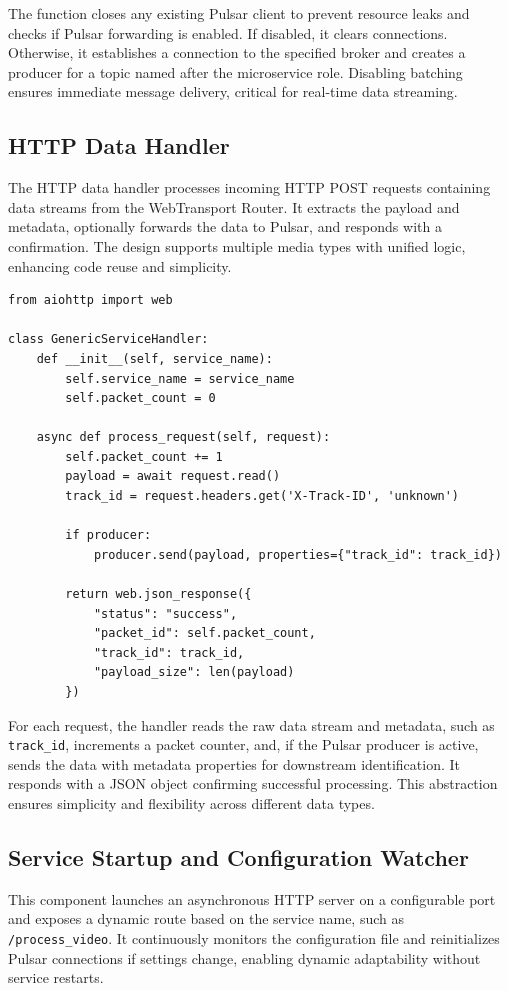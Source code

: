The function closes any existing Pulsar client to prevent resource leaks and checks if Pulsar forwarding is enabled. If disabled, it clears connections. Otherwise, it establishes a connection to the specified broker and creates a producer for a topic named after the microservice role. Disabling batching ensures immediate message delivery, critical for real-time data streaming.

\subsection{HTTP Data Handler}
The HTTP data handler processes incoming HTTP POST requests containing data streams from the WebTransport Router. It extracts the payload and metadata, optionally forwards the data to Pulsar, and responds with a confirmation. The design supports multiple media types with unified logic, enhancing code reuse and simplicity.

\begin{lstlisting}[breaklines=true,basicstyle=\small\ttfamily,frame=single]
from aiohttp import web

class GenericServiceHandler:
    def __init__(self, service_name):
        self.service_name = service_name
        self.packet_count = 0

    async def process_request(self, request):
        self.packet_count += 1
        payload = await request.read()
        track_id = request.headers.get('X-Track-ID', 'unknown')

        if producer:
            producer.send(payload, properties={"track_id": track_id})

        return web.json_response({
            "status": "success",
            "packet_id": self.packet_count,
            "track_id": track_id,
            "payload_size": len(payload)
        })
\end{lstlisting}

For each request, the handler reads the raw data stream and metadata, such as \texttt{track\_id}, increments a packet counter, and, if the Pulsar producer is active, sends the data with metadata properties for downstream identification. It responds with a JSON object confirming successful processing. This abstraction ensures simplicity and flexibility across different data types.

\subsection{Service Startup and Configuration Watcher}
This component launches an asynchronous HTTP server on a configurable port and exposes a dynamic route based on the service name, such as \texttt{/process\_video}. It continuously monitors the configuration file and reinitializes Pulsar connections if settings change, enabling dynamic adaptability without service restarts.

